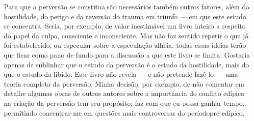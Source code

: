 Para que a perversão se constitua,\idxhost[|(] são necessários também outros
fatores, além da hostilidade, do perigo e da reversão do trauma em
triunfo --- em que este estudo se concentra. Seria, por exemplo, de
valor inestimável um livro inteiro a respeito do papel da culpa,\idxculpa{}
consciente e inconsciente. Mas não faz sentido repetir o que já foi
estabelecido, ou especular sobre a especulação alheia; todas essas
ideias terão que ficar como pano de fundo para a discussão a que este
livro se limita. Gostaria apenas de sublinhar que o estudo da perversão
é o estudo da hostilidade, mais do que o estudo da libido. Este livro
não revela --- e não pretende fazê-lo --- uma teoria completa da
perversão. Minha decisão, por exemplo, de não comentar em detalhe
algumas obras de outros autores sobre a importância do conflito\idxconfe{} edípico
na criação da perversão tem seu propósito; faz com que eu possa ganhar
tempo, permitindo concentrar-me em questões mais controversas do
período\idxpreedi[|(] pré-edípico.\idxconfedese{}

